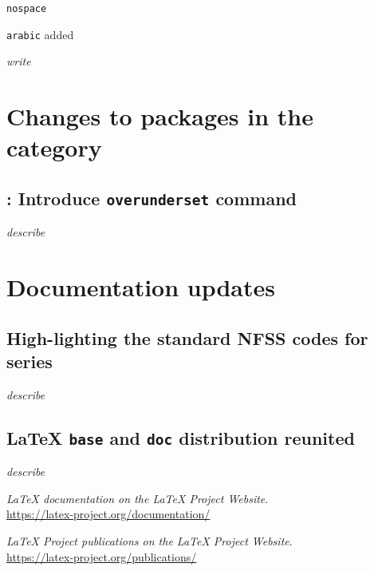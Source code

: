 \documentclass{ltnews}
\providecommand\option[1]{\texttt{#1}}
\begin{document}
\option{nospace}

\option{arabic} added

\emph{write}


        
\section{Changes to packages in the  category}

\subsection{: Introduce \texttt{overunderset} command}

\emph{describe}



\section{Documentation updates}

\subsection{High-lighting the standard NFSS codes for series}

\emph{describe}


\subsection{\LaTeX{} \texttt{base} and \texttt{doc} distribution reunited}
      
\emph{describe}


\begin{thebibliography}{9}
  
  \emph{\LaTeX{} documentation on the \LaTeX{} Project Website}.\\  
  \url{https://latex-project.org/documentation/}

  \emph{\LaTeX{} Project publications on the \LaTeX{} Project Website}.\\
  \url{https://latex-project.org/publications/}

\end{thebibliography}
\end{document}
